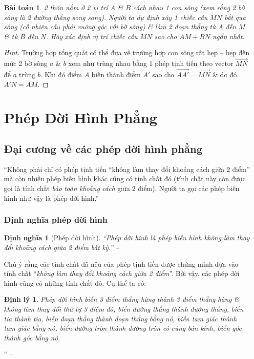 \documentclass[oneside]{book}
\numberwithin{equation}{section}
\newtheorem{dinhnghia}{Định nghĩa}[section]
\newtheorem{baitoan}{Bài toán}[section]
\newtheorem{dinhly}{Định lý}[section]
\begin{document}
\begin{baitoan}
	2 thôn nằm ở 2 vị trí $A$ \& $B$ cách nhau 1 con sông (xem rằng 2 bờ sông là 2 đường thẳng song song). Người ta dự định xây 1 chiếc cầu $MN$ bắt qua sông (cố nhiên cầu phải vuông góc với bờ sông) \& làm 2 đoạn thẳng từ $A$ đến $M$ \& từ $B$ đến $N$. Hãy xác định vị trí chiếc cầu $MN$ sao cho $AM + BN$ ngắn nhất.
\end{baitoan}

\begin{proof}[Hint]
	Trường hợp tổng quát có thể đưa về trường hợp con sông rất hẹp -- hẹp đến mức 2 bờ sông $a$ \& $b$ xem như trùng nhau bằng 1 phép tịnh tiến theo vector $\overrightarrow{MN}$ để $a$ trùng $b$. Khi đó điểm $A$ biến thành điểm $A'$ sao cho $\overrightarrow{AA'} = \overrightarrow{MN}$ \& do đó $A'N = AM$.
\end{proof}

\section{Phép Dời Hình Phẳng}

\subsection{Đại cương về các phép dời hình phẳng}
``Không phải chỉ có phép tịnh tiến ``không làm thay đổi khoảng cách giữa 2 điểm'' mà còn nhiều phép biến hình khác cũng có tính chất đó (tính chất này còn được gọi là tính chất \textit{bảo toàn khoảng cách} giữa 2 điểm). Người ta gọi các phép biến hình như vậy là phép dời hình.'' -- \cite[p. 8]{SGK_Toan_11_hinh_hoc_nang_cao}

\subsubsection{Định nghĩa phép dời hình}

\begin{dinhnghia}[Phép dời hình]
	``\emph{Phép dời hình} là phép biến hình không làm thay đổi khoảng cách giữa 2 điểm bất kỳ.'' -- \cite[p. 8]{SGK_Toan_11_hinh_hoc_nang_cao}
\end{dinhnghia}
Chú ý rằng các tính chất đã nêu của phép tịnh tiến được chứng minh dựa vào tính chất ``\textit{không làm thay đổi khoảng cách giữa 2 điểm}''. Bởi vậy, các phép dời hình cũng có những tính chất đó. Cụ thể ta có:

\begin{dinhly}
	Phép dời hình biến 3 điểm thẳng hàng thành 3 điểm thẳng hàng \& không làm thay đổi thứ tự 3 điểm đó, biến đường thằng thành đường thẳng, biến tia thành tia, biến đoạn thẳng thành đoạn thẳng bằng nó, biến tam giác thành tam giác bằng nó, biến đường tròn thành đường tròn có cùng bán kính, biến góc thành góc bằng nó.
\end{dinhly}
'' -- \cite[p. 8]{SGK_Toan_11_hinh_hoc_nang_cao}
\end{document}
